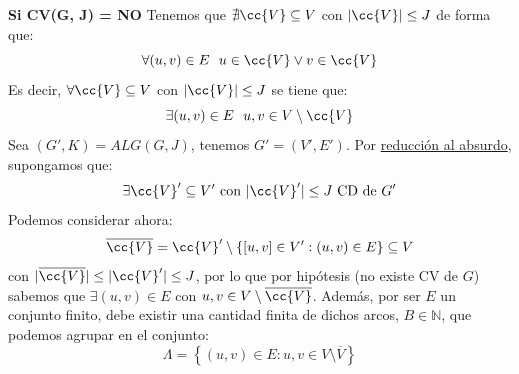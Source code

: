 \documentclass[12pt]{article}
\newcommand{\CV}{CV(G, J) }
\newcommand{\ALG}{ALG(G, J) }
\begin{document}
    \noindent
    \textbf{Si \CV = NO}\newline
    Tenemos que $\nexists \cc{V}\subseteq V$ con $|\cc{V}|\leq J$ de forma que:
    \begin{equation*}
        \forall (u,v)\in E~~u\in \cc{V}\lor v\in \cc{V}
    \end{equation*}
    Es decir, $\forall \cc{V}\subseteq V$ con $|\cc{V}|\leq J$ se tiene que:
    \begin{equation*}
        \exists (u,v)\in E~~u,v\in V\setminus \cc{V}
    \end{equation*}
    Sea $(G',K) = \ALG$, tenemos $G'=(V',E')$. Por \underline{reducción al absurdo}, supongamos que:
    \begin{equation*}
        \exists \cc{V}'\subseteq V' \text{\ con\ } |\cc{V}'|\leq J \text{\ CD de\ } G'
    \end{equation*}
    Podemos considerar ahora:
    \begin{equation*}
        \overline{\cc{V}} = \cc{V}' \setminus \{[u,v] \in V' : (u,v)\in E\}\subseteq V
    \end{equation*}
    con $|\overline{\cc{V}}|\leq |\cc{V}'|\leq J$, por lo que por hipótesis (no existe CV de $G$) sabemos que $\exists (u,v)\in E$ con $u,v\in V\setminus \overline{\cc{V}}$. Además, por ser $E$ un conjunto finito, debe existir una cantidad finita de dichos arcos, $B\in \mathbb{N}$, que podemos agrupar en el conjunto:
    \begin{equation*}
        \Lambda = \left\{(u,v)\in E : u,v\in V\setminus \overline{V}\right\}
    \end{equation*}
\end{document}
